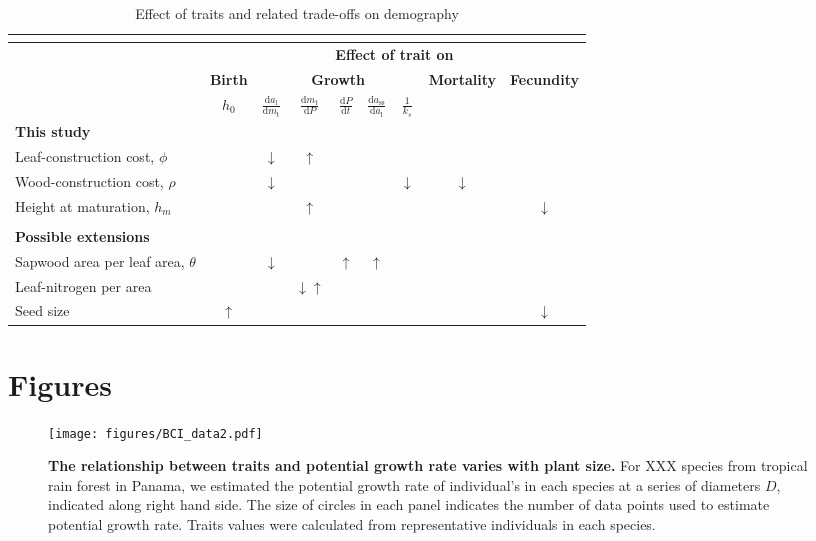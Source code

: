 \documentclass[12pt, a4paper]{article}
\makeatletter
\def\maxwidth{\ifdim\Gin@nat@width>\linewidth\linewidth
\else\Gin@nat@width\fi}
\let\Oldincludegraphics\includegraphics
\renewcommand{\includegraphics}[1]{\Oldincludegraphics[width=\maxwidth]{#1}}
\makeatother
\begin{document}
\begin{table}[h]
\caption{Effect of traits and related trade-offs on demography}
\centering
{\footnotesize  %
  \begin{doublespace}
  \begin{tabular}[c]{l|c|ccccc|c|c}
  \multicolumn{9}{c}{}\\ \hline
  & \multicolumn{8}{c}{\textbf{Effect of trait on}}\\
  & \textbf{Birth} & \multicolumn{5}{c|}{\textbf{Growth}} & \textbf{Mortality} & \textbf{Fecundity} \\
  & $h_0$
  & $\frac{\textrm{d}a_\textrm{l}}{\textrm{d}m_\textrm{t}}$
  & $\frac{\textrm{d}m_\textrm{t}}{\textrm{d}P}$
  & $\frac{\textrm{d}P}{\textrm{d}t}$
  & $\frac{\textrm{d}a_\textrm{ss}}{\textrm{d}a_\textrm{l}}$
  & $\frac{1}{k_s}$ & &  \\\hline
  \textbf{This study}&&&&&&&&\\
  Leaf-construction cost, $\phi$ & & $\downarrow$ & $\uparrow$ & & & & \\
  Wood-construction cost, $\rho$ & & $\downarrow$ &  & & & $\downarrow$ & $\downarrow$  \\
  Height at maturation, $h_m$ & & &$\uparrow$ & & & & & $\downarrow$  \\
  &&&&&&&&\\\hline
  \textbf{Possible extensions}&&&&&&&&\\
  Sapwood area per leaf area, $\theta$ & & $\downarrow$& & $\uparrow$ & $\uparrow$ & & \\
  Leaf-nitrogen per area & & &$\downarrow$$\uparrow$ & & & & & \\
  Seed size & $\uparrow$ & & & & & & & $\downarrow$ \\ \hline
  \end{tabular}
  \end{doublespace}
}
\label{tab:trade-offs}
\end{table}


\newpage

\section{Figures}\label{figures}

\begin{figure}[htbp]
\centering
\texttt{[image: figures/BCI\_data2.pdf]}
\caption{\textbf{The relationship between traits and potential growth
rate varies with plant size.} For XXX species from tropical rain forest
in Panama, we estimated the potential growth rate of individual's in
each species at a series of diameters $D$, indicated along right hand
side. The size of circles in each panel indicates the number of data
points used to estimate potential growth rate. Traits values were
calculated from representative individuals in each species.
\label{f-BCI}}
\end{figure}
\end{document}
